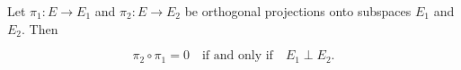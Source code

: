 Let $\pi_1: E \rightarrow E_1$ and $\pi_2: E \rightarrow E_2$ be orthogonal projections onto subspaces $E_1$ and $E_2$. Then

$$\pi_2 \circ \pi_1 = 0 \quad \text{if and only if} \quad E_1 \perp E_2.$$
